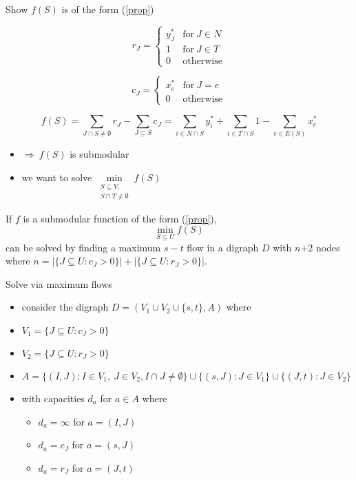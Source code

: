 \documentclass[usenames,dvipsnames]{beamer}
\begin{document}
\begin{frame}{Show $f(S)$ is of the form (\ref{prop})}
  \begin{minipage}{0.49\textwidth}
    \[r_J = \begin{cases} y_J^* & \text{for}~J \in N\\
      1 & \text{for}~J \in T\\
      0 & \text{otherwise}\end{cases}\]
  \end{minipage}
  \begin{minipage}{0.49\textwidth}
    \[c_J = \begin{cases} x^*_e & \text{for}~J=e\\
      0 & \text{otherwise}\end{cases}\]
  \end{minipage}
  \[f(S) = \sum\limits_{J \cap S \neq \emptyset} r_J - \sum\limits_{J \subseteq S} c_J = \sum\limits_{i \in N \cap S} y^*_i + \sum\limits_{i
    \in T \cap S} 1 - \sum\limits_{e \in E(S)} x^*_e\]
  \begin{itemize}
    \item $\Rightarrow~f(S)$ is submodular
    \item we want to solve $\min\limits_{\substack{S \subseteq V,\\S
        \cap T \neq \emptyset}} f(S)$
  \end{itemize}
\end{frame}

\begin{frame}
  \begin{theorem}
    If $f$ is a submodular function of the form
    (\ref{prop}), \[\min\limits_{S \subseteq U} f(S)\] can be solved
    by finding a maximum $s-t$ flow in a digraph $D$ with $n$+2 nodes
    where $n = |\{J \subseteq U: c_J > 0\}| + |\{J \subseteq U: r_J >
    0\}|$.
  \end{theorem}
\end{frame}

\begin{frame}{Solve via maximum flows}
  \begin{itemize}
  \item consider the digraph $D = (V_1 \cup V_2 \cup \{s,t\}, A)$ where
    \item $V_1 = \{J \subseteq U: c_J > 0\}$
    \item $V_2 = \{J \subseteq U: r_J > 0\}$
    \item $A = \{(I,J) : I \in V_1,~J \in V_2, I \cap J \neq
      \emptyset\} \cup \{(s, J) : J \in V_1\} \cup \{(J, t): J \in
      V_2\}$
    \item with capacities $d_a$ for $a \in A$ where
      \begin{itemize}
      \item $d_a = \infty$ for $a = (I,J)$
      \item $d_a = c_J$ for $a = (s,J)$
      \item $d_a = r_J$ for $a = (J,t)$
      \end{itemize}
  \end{itemize}
\end{frame}
\end{document}
